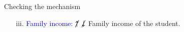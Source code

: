 \documentclass[9pt]{beamer}
\begin{document}
\begin{frame}{Checking the mechanism}
            \begin{itemize}  
            \item[iii. ] \textcolor{blue}{Family income:} \textcolor{blue}{$\cancel{\uparrow}$ } \textcolor{blue}{$\cancel{\downarrow}$ } Family income of the student.
\begin{center} 
\end{center}  
        \end{itemize} \\~\\
\end{frame}


\end{document}
